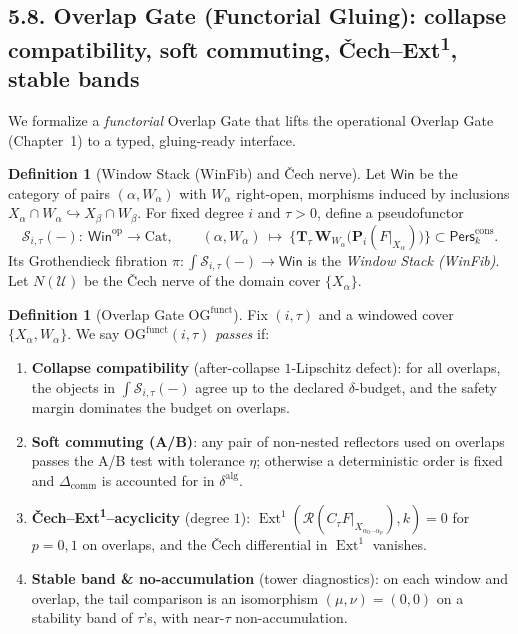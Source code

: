 \documentclass[11pt]{article}
\numberwithin{equation}{section}
\theoremstyle{plain}
\theoremstyle{definition}
\theoremstyle{remark}
\DeclareMathOperator{\Ext}{Ext}
\theoremstyle{plain}
\theoremstyle{definition}
\numberwithin{equation}{section}
\theoremstyle{definition}
\newtheorem{definition}[theorem]{Definition}
\numberwithin{equation}{section}
\theoremstyle{plain}
\theoremstyle{definition}
\theoremstyle{remark}
\newcommand{\Crop}{\mathbf{W}}
\begin{document}
\subsection*{5.8. Overlap Gate (Functorial Gluing): collapse compatibility, soft commuting, Čech–Ext\textsuperscript{1}, stable bands}

We formalize a \emph{functorial} Overlap Gate that lifts the operational Overlap Gate (Chapter~1) to a typed, gluing-ready interface.

\begin{definition}[Window Stack (WinFib) and Čech nerve]\label{def:winfib}
Let $\mathsf{Win}$ be the category of pairs $(\alpha,W_\alpha)$ with $W_\alpha$ right-open, morphisms induced by inclusions $X_\alpha\cap W_\alpha\hookrightarrow X_\beta\cap W_\beta$. For fixed degree $i$ and $\tau>0$, define a pseudo\-functor
\[
\mathcal{S}_{i,\tau}(-):\ \mathsf{Win}^{\mathrm{op}}\longrightarrow \mathrm{Cat},\qquad (\alpha,W_\alpha)\ \longmapsto\ \Big\{\mathbf{T}_\tau\,\Crop_{W_\alpha}\big(\mathbf{P}_i(F|_{X_\alpha})\big)\Big\}\subset\mathsf{Pers}^{\mathrm{cons}}_k.
\]
Its Grothendieck fibration $\pi:\int\mathcal{S}_{i,\tau}(-)\to \mathsf{Win}$ is the \emph{Window Stack (WinFib)}. Let $N(\mathcal{U})$ be the Čech nerve of the domain cover $\{X_\alpha\}$.
\end{definition}

\begin{definition}[Overlap Gate \texorpdfstring{$\mathrm{OG}^{\mathrm{funct}}$}{OG^funct}]\label{def:og-funct}
Fix $(i,\tau)$ and a windowed cover $\{X_\alpha,W_\alpha\}$. We say $\mathrm{OG}^{\mathrm{funct}}(i,\tau)$ \emph{passes} if:
\begin{enumerate}
  \item \textbf{Collapse compatibility} (after-collapse $1$-Lipschitz defect): for all overlaps, the objects in $\int\mathcal{S}_{i,\tau}(-)$ agree up to the declared $\delta$-budget, and the safety margin dominates the budget on overlaps.
  \item \textbf{Soft commuting (A/B)}: any pair of non-nested reflectors used on overlaps passes the A/B test with tolerance $\eta$; otherwise a deterministic order is fixed and $\Delta_{\mathrm{comm}}$ is accounted for in $\delta^{\mathrm{alg}}$.
  \item \textbf{Čech–Ext\textsuperscript{1}–acyclicity} (degree $1$): $\Ext^1(\mathcal{R}(C_\tau F|_{X_{\alpha_0\cdots\alpha_p}}),k)=0$ for $p=0,1$ on overlaps, and the Čech differential in $\Ext^1$ vanishes.
  \item \textbf{Stable band \& no-accumulation} (tower diagnostics): on each window and overlap, the tail comparison is an isomorphism $(\mu,\nu)=(0,0)$ on a stability band of $\tau$’s, with near-$\tau$ non-accumulation.
\end{enumerate}
\end{definition}
\end{document}
